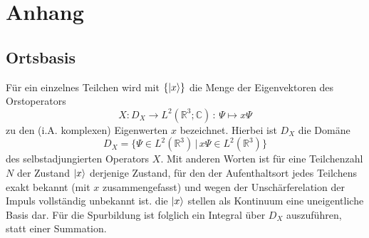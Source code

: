 % 
% 
% 
% 

\chapter{Anhang}
\section{Ortsbasis}
\label{sec:A_1}
Für ein einzelnes Teilchen wird mit $\{\ket{x}\}$ die Menge der Eigenvektoren des Orstoperators
\begin{equation*}
  X:D_X \rightarrow L^2(\mathbb{R}^3;\mathbb{C}) \, : \, \Psi \mapsto x\Psi
\end{equation*}
zu den (i.A. komplexen) Eigenwerten $x$ bezeichnet. Hierbei ist $D_X$ die Domäne
\begin{equation*}
  D_X = \{\Psi \in L^2(\mathbb{R}^3) \, | \, x\Psi \in L^2(\mathbb{R}^3) \}
\end{equation*}
des selbstadjungierten Operators $X$. Mit anderen Worten ist für eine Teilchenzahl $N$ der Zustand $\ket{x}$ derjenige Zustand, für den der Aufenthaltsort jedes Teilchens exakt bekannt (mit $x$ zusammengefasst) und wegen der Unschärferelation der Impuls vollständig unbekannt ist.
die $\ket{x}$ stellen als Kontinuum eine uneigentliche Basis dar. Für die Spurbildung ist folglich ein Integral über $D_X$ auszuführen, statt einer Summation.

